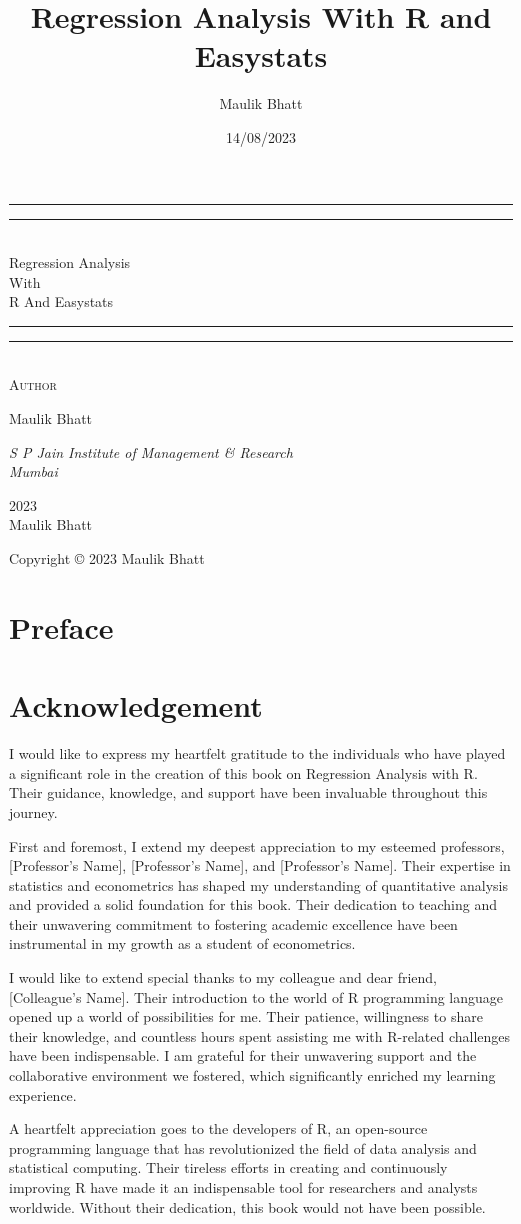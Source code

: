 \documentclass[
  letterpaper,
  paper =a4,
  twoside,
  openright,
  headsepline,
  footsepline,
  listof = totocnumbered,
  chapterprefix = true,
  firstiscover]{scrbook}
\title{Regression Analysis With R and Easystats}
\author{Maulik Bhatt}
\date{14/08/2023}
\renewcommand{\maketitle}{
\begin{titlepage}
		\pagecolor{myblue}
		\color{white}
	\centering
	\vspace*{\baselineskip}
	\rule{\textwidth}{1.6pt}\vspace*{-\baselineskip}\vspace*{2pt}
	\rule{\textwidth}{0.4pt}\\[\baselineskip]
	{\LARGE Regression Analysis\\ With \\[0.3\baselineskip] R And Easystats}\\[0.2\baselineskip]
	\rule{\textwidth}{0.4pt}\vspace*{-\baselineskip}\vspace{3.2pt}
	\rule{\textwidth}{1.6pt}\\[\baselineskip]
	\scshape
	\vspace*{8\baselineskip}
	Author \\[\baselineskip]
	{\Large Maulik Bhatt \par}
	{\itshape S P Jain Institute of Management \& Research \\ Mumbai\par}
	\vfill
	{\scshape 2023} \\
	{\large Maulik Bhatt}\par%

\end{titlepage}
\nopagecolor%
\newpage
	
	\thispagestyle{empty}
	
	\begin{center}
		
		Copyright © 2023 Maulik Bhatt
		
	\end{center}
	\newpage
}
\renewcommand*\contentsname{Table of contents}
\newcommand\contentsname{Table of contents}
\begin{document}
\frontmatter
\maketitle
\renewcommand*\contentsname{Contents}
{
\hypersetup{linkcolor=}
\setcounter{tocdepth}{2}
\tableofcontents
}
\listoffigures
\listoftables
{}
\mainmatter
{}

\hypertarget{preface}{%
\chapter*{Preface}\label{preface}}



\hypertarget{acknowledgement}{%
\chapter*{Acknowledgement}\label{acknowledgement}}


I would like to express my heartfelt gratitude to the individuals who
have played a significant role in the creation of this book on
Regression Analysis with R. Their guidance, knowledge, and support have
been invaluable throughout this journey.

First and foremost, I extend my deepest appreciation to my esteemed
professors, {[}Professor's Name{]}, {[}Professor's Name{]}, and
{[}Professor's Name{]}. Their expertise in statistics and econometrics
has shaped my understanding of quantitative analysis and provided a
solid foundation for this book. Their dedication to teaching and their
unwavering commitment to fostering academic excellence have been
instrumental in my growth as a student of econometrics.

I would like to extend special thanks to my colleague and dear friend,
{[}Colleague's Name{]}. Their introduction to the world of R programming
language opened up a world of possibilities for me. Their patience,
willingness to share their knowledge, and countless hours spent
assisting me with R-related challenges have been indispensable. I am
grateful for their unwavering support and the collaborative environment
we fostered, which significantly enriched my learning experience.

A heartfelt appreciation goes to the developers of R, an open-source
programming language that has revolutionized the field of data analysis
and statistical computing. Their tireless efforts in creating and
continuously improving R have made it an indispensable tool for
researchers and analysts worldwide. Without their dedication, this book
would not have been possible.
\end{document}
